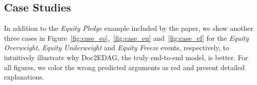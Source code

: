 \documentclass[11pt,a4paper]{article}
\begin{document}
\begin{table*}[tb]
\begin{tabular}{l | ccc | ccc | ccc | ccc | ccc | ccc }
\\
\bottomrule
\end{tabular}
\caption{Evaluation results of entity extraction and event triggering for each event type on the test set, where we can observe that 1) different models produce roughly consistent entity-extraction performance, which corresponds to our setting that all models share the same architecture when extracting entities; 2) the document-level event triggering is superior to the sentence-level event triggering (key-event sentence detection used in DCFEE), because both the DS-based labeling and the event-triggering learning can be more accurate and robust at the document level, and the assumption to identify key-event sentences used by DCFEE is hard to fit all event types well.}
\label{tab:add_res}
\end{table*}


\subsection{Case Studies}
\label{sec:case}
In addition to the \textit{Equity Pledge} example included by the paper,
we show another three cases in Figure~\ref{fig:case_eo},~\ref{fig:case_eu} and~\ref{fig:case_ef} for the \textit{Equity Overweight}, \textit{Equity Underweight} and \textit{Equity Freeze} events, respectively, to intuitively illustrate why Doc2EDAG, the truly end-to-end model, is better.
For all figures, we color the wrong predicted arguments as red and present detailed explanations.
\end{document}
